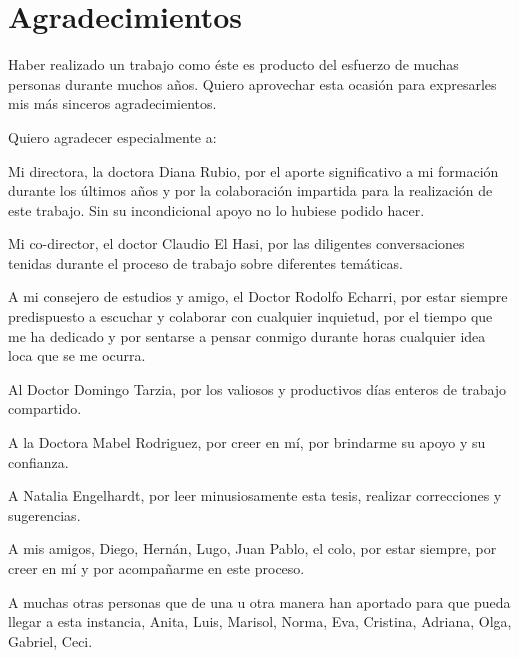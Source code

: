 \chapter*{Agradecimientos}

Haber realizado un trabajo como \'este es producto del esfuerzo de muchas
personas durante muchos a\~nos. Quiero aprovechar esta ocasi\'on para expresarles
mis m\'as sinceros agradecimientos.

Quiero agradecer especialmente a:

Mi directora, la doctora Diana Rubio, por el aporte significativo a mi
formaci\'on durante los \'ultimos a\~nos y por la colaboraci\'on impartida para la
realizaci\'on de este trabajo. Sin su incondicional apoyo no lo hubiese podido hacer.

Mi co-director, el doctor Claudio El Hasi, por las diligentes conversaciones tenidas 
durante el proceso de trabajo sobre diferentes tem\'aticas.

A mi consejero de estudios y amigo, el Doctor Rodolfo Echarri, por estar
siempre predispuesto a escuchar y colaborar con cualquier inquietud, por el
tiempo que me ha dedicado y por sentarse a pensar conmigo durante horas
cualquier idea loca que se me ocurra.

Al Doctor Domingo Tarzia, por los valiosos y productivos d\'ias enteros de 
trabajo compartido.

A la Doctora Mabel Rodriguez, por creer en m\'i, por brindarme su apoyo y su confianza.


A Natalia Engelhardt, por leer minusiosamente esta tesis, realizar 
correcciones y sugerencias.  

A mis amigos, Diego, Hern\'an, Lugo, Juan Pablo, el colo, por estar siempre, por creer en m\'i 
y por acompa\~narme en este proceso. 

A muchas otras personas que de una u otra manera han aportado para que
pueda llegar a esta instancia, Anita, Luis, Marisol, Norma, Eva, Cristina, Adriana,
Olga, Gabriel, Ceci.
